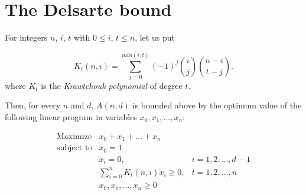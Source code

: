 \section{The Delsarte bound}
\begin{theorem}
    For integers $n$, $i$, $t$ with $0 \leq i$, $t \leq n$, let us put

    \begin{equation}
        K_t(n,i) = \sum_{j=0}^{min(i,t)}(-1)^j{i \choose j}{n - i \choose t - j}.
    \end{equation}
    where $K_t$ is the \emph{Krawtchouk polynomial} of degree $t$.

    Then, for every $n$ and $d$, $A(n,d)$ is bounded above by the optimum value of the following linear program in variables $x_0, x_1, \ldots, x_n$:

    \begin{equation}
        \begin{array}{lll}
            \text{Maximize}   & x_0 + x_1 + \ldots + x_n                       &                  \\
            \text{subject to} & x_0 = 1                                        &                  \\
                              & x_i = 0,                                       & i=1,2,\ldots,d-1 \\
                              & \sum\limits_{i=0}^{n}K_t(n,i) \dot x_i \geq 0, & t=1,2,\ldots,n   \\
                              & x_0, x_1, \ldots, x_n \geq 0                   &                  \\
        \end{array}
    \end{equation}
\end{theorem}

\begin{example}
\end{example}
